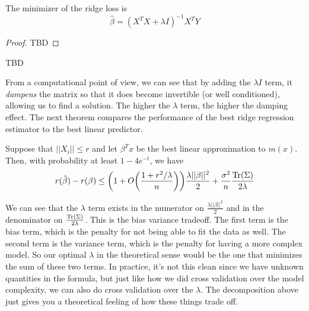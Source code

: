   \begin{theorem}
    The minimizer of the ridge loss is 
    \begin{equation}
      \hat{\beta} = (X^T X+ \lambda I)^{-1} X^T Y
    \end{equation}
  \end{theorem}
  \begin{proof}
    TBD
  \end{proof}

  \begin{theorem}
    TBD 
  \end{theorem}

  From a computational point of view, we can see that by adding the $\lambda I$ term, it \textit{dampens} the matrix so that it does become invertible (or well conditioned), allowing us to find a solution. The higher the $\lambda$ term, the higher the damping effect. The next theorem compares the performance of the best ridge regression estimator to the best linear predictor. 

  \begin{theorem} 
    Suppose that $||X_i|| \leq r$ and let $\beta^T x$ be the best linear approximation to $m(x)$. Then, with probability at least $1 - 4 e^{-t}$, we have
    \begin{equation}
      r(\hat{\beta}) - r(\beta) \leq \bigg( 1 + O \bigg( \frac{1 + r^2 / \lambda}{n} \bigg) \bigg) \frac{\lambda ||\beta||^2}{2} + \frac{\sigma^2}{n} \frac{\operatorname{Tr}(\Sigma)}{2 \lambda}
    \end{equation}
  \end{theorem}

  We can see that the $\lambda$ term exists in the numerator on $\frac{\lambda ||\beta||^2}{2}$ and in the denominator on $\frac{\operatorname{Tr}(\Sigma)}{2 \lambda}$. This is the bias variance tradeoff. The first term is the bias term, which is the penalty for not being able to fit the data as well. The second term is the variance term, which is the penalty for having a more complex model. So our optimal $\lambda$ in the theoretical sense would be the one that minimizes the sum of these two terms. In practice, it's not this clean since we have unknown quantities in the formula, but just like how we did cross validation over the model complexity, we can also do cross validation over the $\lambda$. The decomposition above just gives you a theoretical feeling of how these things trade off. 

